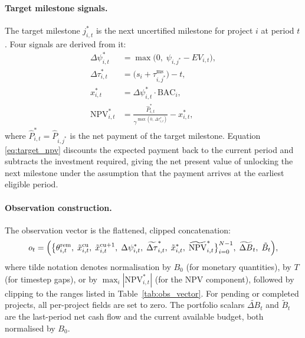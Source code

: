 \paragraph{Target milestone signals.} The target milestone
$j^*_{i,t}$ is the next uncertified milestone for project $i$ at
period $t$. Four signals are derived from it:
\begin{align}
  \Delta\psi^*_{i,t}
    &= \max\!\bigl(0,\; \psi_{i,j^*} - EV_{i,t}\bigr),
  \label{eq:target_pg} \\
  \Delta\tau^*_{i,t}
    &= \bigl(s_i + \tau^{\mathrm{ms}}_{i,j^*}\bigr) - t,
  \label{eq:target_tg} \\
  x^*_{i,t}
    &= \Delta\psi^*_{i,t} \cdot \mathrm{BAC}_i,
  \label{eq:target_alloc} \\
  \mathrm{NPV}^*_{i,t}
    &= \frac{\hat{P}^*_{i,t}}
            {\gamma^{\max(0,\,\Delta\tau^*_{i,t})}}
       - x^*_{i,t},
  \label{eq:target_npv}
\end{align}
where $\hat{P}^*_{i,t} = \hat{P}_{i,j^*}$ is the net payment of the
target milestone. Equation \eqref{eq:target_npv} discounts the
expected payment back to the current period and subtracts the
investment required, giving the net present value of unlocking the
next milestone under the assumption that the payment arrives at the
earliest eligible period.

\paragraph{Observation construction.} The observation vector is the
flattened, clipped concatenation:
\begin{equation}
  o_t = \Bigl(
    \bigl\{
      \theta^{\mathrm{rem}}_{i,t},\;
      \tilde{x}^{\mathrm{cu}}_{i,t},\;
      \tilde{x}^{\mathrm{cu}+1}_{i,t},\;
      \Delta\psi^*_{i,t},\;
      \widetilde{\Delta\tau}^*_{i,t},\;
      \tilde{x}^*_{i,t},\;
      \widetilde{\mathrm{NPV}}^*_{i,t}
    \bigr\}_{i=0}^{N-1},\;
    \widetilde{\Delta B}_{t},\;
    \tilde{B}_t
  \Bigr),
  \label{eq:obs_vector}
\end{equation}
where tilde notation denotes normalisation by $B_0$ (for monetary
quantities), by $T$ (for timestep gaps), or by
$\max_i |\mathrm{NPV}^*_{i,t}|$ (for the NPV component), followed
by clipping to the ranges listed in Table~\ref{tab:obs_vector}.
For pending or completed projects, all per-project fields are set
to zero. The portfolio scalars $\widetilde{\Delta B}_t$ and
$\tilde{B}_t$ are the last-period net cash flow and the current
available budget, both normalised by $B_0$.

